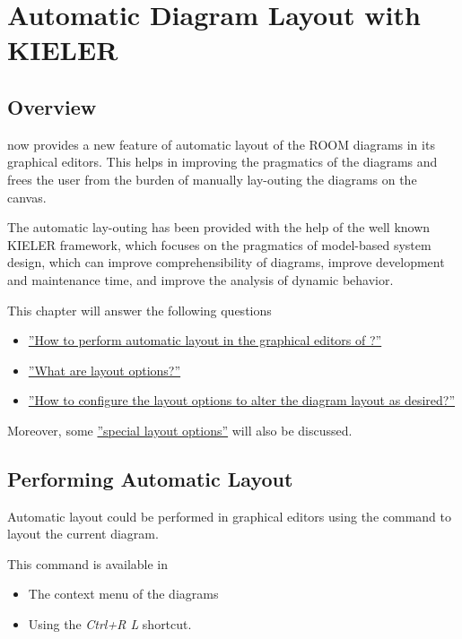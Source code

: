 \section{Automatic Diagram Layout with KIELER}

\subsection{Overview}

\eTrice{} now provides a new feature of automatic layout of the ROOM diagrams in its graphical editors. This 
helps in improving the pragmatics of the diagrams and frees the user from the burden of manually 
lay-outing the diagrams on the canvas. 

The automatic lay-outing has been provided with the help of the well known KIELER framework, which focuses 
on the pragmatics of model-based system design, which can improve comprehensibility of diagrams, improve 
development and maintenance time, and improve the analysis of dynamic behavior.

This chapter will answer the following questions
\begin{itemize}
\item \hyperref[performLayout]{''How to perform automatic layout in the graphical editors of \eTrice{}?''}
\item \hyperref[layoutOptions]{''What are layout options?''}
\item \hyperref[configureOptions]{''How to configure the layout options to alter the diagram layout as 
desired?''}
\end{itemize}

Moreover, some \hyperref[specialOptions]{''special layout options''} will also be discussed.

\subsection{Performing Automatic Layout}
\label{performLayout}

Automatic layout could be performed in \eTrice{} graphical editors using the command to layout the current 
diagram.

This command is available in

\begin{itemize}
\item The context menu of the diagrams
\item Using the \textit{Ctrl+R L} shortcut.
\end{itemize}

